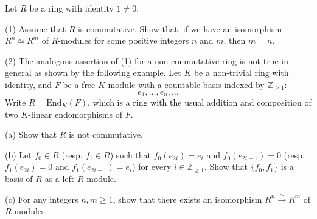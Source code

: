 \begin{exercise}
\label{algebra:2023:2}
Let $R$ be a ring with identity $1 \neq 0$.

(1) Assume that $R$ is commutative. Show that, if we have an isomorphism $R^n \simeq R^m$ of $R$-modules for some positive integers $n$ and $m$, then $m = n$.

(2) The analogous assertion of (1) for a non-commutative ring is not true in general as shown by the following example. Let $K$ be a non-trivial ring with identity, and $F$ be a free $K$-module with a countable basis indexed by $\mathbb{Z}_{\geq 1}$:
$$e_1, \ldots, e_n, \ldots$$
Write $R = \mathrm{End}_K(F)$, which is a ring with the usual addition and composition of two $K$-linear endomorphisms of $F$.

(a) Show that $R$ is not commutative.

(b) Let $f_0 \in R$ (resp. $f_1 \in R$) such that $f_0(e_{2i}) = e_i$ and $f_0(e_{2i-1}) = 0$ (resp. $f_1(e_{2i}) = 0$ and $f_1(e_{2i-1}) = e_i$) for every $i \in \mathbb{Z}_{\geq 1}$. Show that $\{f_0, f_1\}$ is a basis of $R$ as a left $R$-module.

(c) For any integers $n, m \geq 1$, show that there exists an isomorphism $R^n \stackrel{\sim}{\to} R^m$ of $R$-modules.
\end{exercise}

